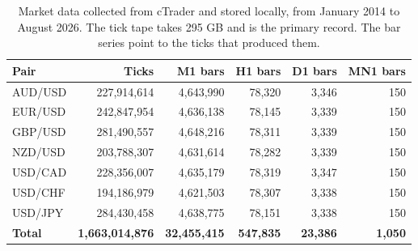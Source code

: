\begin{table}[htb!]
\centering
\footnotesize
\caption{Market data collected from cTrader and stored locally, from January 2014 to August 2026. The tick tape takes 295 GB and is the primary record. The bar series point to the ticks that produced them.}
\label{Tables:DataInventory}
\begin{tabular}{@{}lrrrrr@{}}
\toprule
\textbf{Pair} & \textbf{Ticks} & \textbf{M1 bars} & \textbf{H1 bars} & \textbf{D1 bars} & \textbf{MN1 bars} \\
\midrule
AUD/USD & 227,914,614 & 4,643,990 & 78,320 & 3,346 & 150 \\
EUR/USD & 242,847,954 & 4,636,138 & 78,145 & 3,339 & 150 \\
GBP/USD & 281,490,557 & 4,648,216 & 78,311 & 3,339 & 150 \\
NZD/USD & 203,788,307 & 4,631,614 & 78,282 & 3,339 & 150 \\
USD/CAD & 228,356,007 & 4,635,179 & 78,319 & 3,347 & 150 \\
USD/CHF & 194,186,979 & 4,621,503 & 78,307 & 3,338 & 150 \\
USD/JPY & 284,430,458 & 4,638,775 & 78,151 & 3,338 & 150 \\
\midrule
\textbf{Total} & \textbf{1,663,014,876} & \textbf{32,455,415} & \textbf{547,835} & \textbf{23,386} & \textbf{1,050} \\
\bottomrule
\end{tabular}
\end{table}